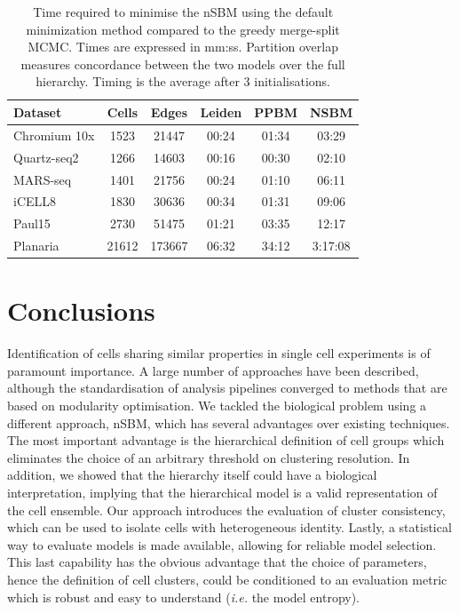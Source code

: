 \documentclass[10pt]{article}
\begin{document}
\begin{table}[h!]
\centering
 \begin{tabular}{|| l c c c c c ||}
 \hline
 \textbf{Dataset} & \textbf{Cells} & \textbf{Edges} & \textbf{Leiden} & \textbf{PPBM} & \textbf{NSBM} \\ [0.5ex] 
 \hline\hline
 Chromium 10x \cite{mereu_2020} & 1523 & 21447 & 00:24 & 01:34 & 03:29\\ 
 \hline
 Quartz-seq2 \cite{mereu_2020} & 1266 & 14603 & 00:16 & 00:30 & 02:10 \\
 \hline
 MARS-seq \cite{mereu_2020} & 1401 & 21756 & 00:24 & 01:10 & 06:11 \\
 \hline
 iCELL8 \cite{mereu_2020} & 1830 & 30636 & 00:34 & 01:31 & 09:06 \\
 \hline
 Paul15 \cite{paul_2015} & 2730 & 51475 & 01:21 & 03:35 & 12:17\\ 
 \hline
 Planaria \cite{plass_2018} & 21612 & 173667 & 06:32 & 34:12 & 3:17:08 \\
 \hline
\end{tabular}
\caption{Time required to minimise the nSBM using the default minimization method compared to the greedy merge-split MCMC. Times are expressed in mm:ss. Partition overlap measures concordance between the two models over the full hierarchy. Timing is the average after 3 initialisations.}
\label{Table1}
\end{table}

\section*{Conclusions}

Identification of cells sharing similar properties in single cell experiments is of paramount importance. A large number of approaches have been described, although the standardisation of analysis pipelines converged to methods that are based on modularity optimisation. We tackled the biological problem using a different approach, nSBM, which has several advantages over existing techniques. The most important advantage is the hierarchical definition of cell groups which eliminates the choice of an arbitrary threshold on clustering resolution. In addition, we showed that the hierarchy itself could have a biological interpretation, implying that the hierarchical model is a valid representation of the cell ensemble. Our approach introduces the evaluation of cluster consistency, which can be used to isolate cells with heterogeneous identity. Lastly, a statistical way to evaluate models is made available, allowing for reliable model selection. This last capability has the obvious advantage that the choice of parameters, hence the definition of cell clusters, could be conditioned to an evaluation metric which is robust and easy to understand (\emph{i.e.} the model entropy).
\end{document}
